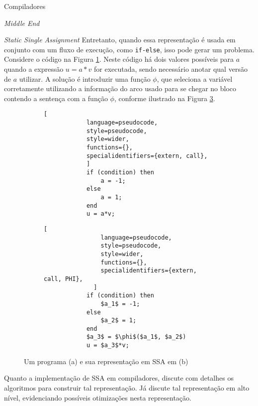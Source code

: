 \begin{section}{Compiladores}
\begin{subsection}{\textit{Middle End}}
\begin{subsubsection}{\textit{Static Single Assignment}}
\vspace*{-0.5cm}
Entretanto, quando essa representação é
    usada em conjunto com um fluxo de execução, como \texttt{if-else}, isso pode gerar um problema. Considere o código
na Figura \ref{fig:code_normal}. Neste código há dois valores possíveis para
$a$ quando a expressão $u = a*v$ for executada, sendo necessário
anotar qual versão de $a$ utilizar. A solução é introduzir uma
função $\phi$, que seleciona a variável corretamente utilizando a informação
do arco usado para se chegar no bloco contendo a sentença com a função $\phi$,
conforme ilustrado na Figura \ref{fig:code_ssa_form}.

\begin{figure}[ht]
    \centering
    \begin{subfigure}[b]{0.40\textwidth}

        \begin{lstlisting}[
            language=pseudocode,
            style=pseudocode,
            style=wider,
            functions={},
            specialidentifiers={extern, call},
            ]
            if (condition) then
                a = -1;
            else
                a = 1;
            end
            u = a*v;
        \end{lstlisting}
        \caption{\label{fig:code_normal}}
    \end{subfigure}
    \begin{subfigure}[b]{0.40\textwidth}
        \begin{lstlisting}[
                language=pseudocode,
                style=pseudocode,
                style=wider,
                functions={},
                specialidentifiers={extern, call, PHI},
              ]
            if (condition) then
                $a_1$ = -1;
            else
                $a_2$ = 1;
            end
            $a_3$ = $\phi$($a_1$, $a_2$)
            u = $a_3$*v;
        \end{lstlisting}
        \caption{\label{fig:code_ssa_form}}
\end{subfigure}
\caption{Um programa (a) e sua representação em SSA em (b)}
\end{figure}

Quanto a implementação de SSA em compiladores, \cite{cytron1991efficiently}
discute com detalhes os algoritmos para construir tal representação. Já
\cite{appel2004modern} discute tal representação em alto nível, evidenciando
possíveis otimizações nesta representação.

\end{subsubsection}


\end{subsection}
\end{section}
